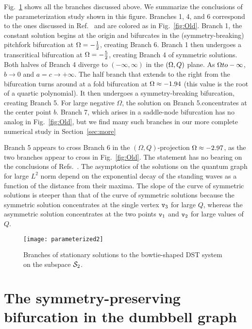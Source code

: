 \documentclass{article}
\numberwithin{equation}{section}
\numberwithin{figure}{section}
\begin{document}
Fig.~\ref{fig:odeBif} shows all the branches discussed above.  We summarize the conclusions of the parameterization study shown in this figure.
%
Branches 1, 4, and 6 correspond to the ones discussed in Ref.~\cite{Marzuola:2016bl} and are colored as in Fig.~\ref{fig:Old}.
%
 Branch 1, the constant solution  begins at the origin and bifurcates in the (symmetry-breaking) pitchfork bifurcation at $\Omega = -\tfrac{1}{2}$, creating Branch 6. Branch 1 then undergoes a transcritical bifurcation at $\Omega = -\tfrac{5}{2}$, creating Branch 4 of symmetric solutions. 
%
 Both halves of Branch 4 diverge to $(-\infty,\infty)$ in the $(\Omega,Q)$ plane. As $\Omega to -\infty$, $b\to0$ and $a=c\to +\infty$.  The half branch that extends to the right from the bifurcation turns around at a fold bifurcation at $\Omega \approx -1.94$ (this value is the root of a quartic polynomial). It then undergoes a symmetry-breaking bifurcation, creating Branch 5.   For large negative $\Omega$, the solution on Branch 5.concentrates at the center point $b$. 
%
Branch 7, which arises in a saddle-node bifurcation has no analog in Fig.~\ref{fig:Old}, but we find many such branches in our more complete numerical study in Section~\ref{sec:more}

Branch 5 appears to cross Branch 6 in the $(\Omega,Q)$-projection $\Omega \approx -2.97$, as the two branches appear to cross in Fig.~\ref{fig:Old}. The statement has no bearing on the conclusions of Refs.~\cite{Marzuola:2016bl,Marzuola:2017}. The asymptotics of the solutions on the quantum graph for large $L^2$ norm depend on the exponential decay of the standing waves as a function of the distance from their maxima. The slope of the curve of symmetric solutions is steeper than that of the curve of symmetric solutions because the symmetric solution concentrates at the single vertex $\mathtt{v}_3$ for large $Q$, whereas the asymmetric solution concentrates at the two points $\mathtt{v}_1$ and $\mathtt{v}_2$ for large values of $Q$.


\begin{figure}[htbp] %
   \centering
   \texttt{[image: parameterized2]} 
   \caption{Branches of stationary solutions to the bowtie-shaped DST system  on the subspace $\mathcal{S}_2$.}
\label{fig:odeBif}
\end{figure}

\section{The symmetry-preserving bifurcation in the dumbbell graph}
\label{sec:missing}
\end{document}
